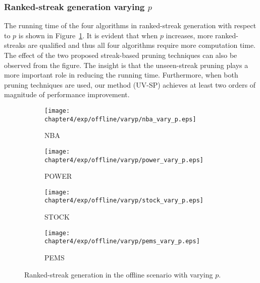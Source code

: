 \subsubsection{Ranked-streak generation varying $p$}
The running time of the four algorithms in ranked-streak generation with respect to $p$ is shown in Figure~\ref{exp:offline_performance_vary_p}. It is evident that when $p$ increases, more ranked-streaks are qualified and thus all four algorithms require more computation time. The effect of the two proposed streak-based pruning techniques can also be observed from the figure. The insight is that the unseen-streak pruning plays a more important role in reducing the running time. Furthermore, when both pruning techniques are used, our method (UV-SP) achieves at least two orders of magnitude of performance improvement.

\begin{figure}[t]
\centering
    \begin{subfigure}[b]{0.45\textwidth}
        \texttt{[image: chapter4/exp/offline/varyp/nba\_vary\_p.eps]}
        \caption{NBA}
    \end{subfigure}
    \begin{subfigure}[b]{0.45\textwidth}
        \texttt{[image: chapter4/exp/offline/varyp/power\_vary\_p.eps]}
        \caption{POWER}
    \end{subfigure}
    \begin{subfigure}[b]{0.45\textwidth}
        \texttt{[image: chapter4/exp/offline/varyp/stock\_vary\_p.eps]}
        \caption{STOCK}
    \end{subfigure}
    \begin{subfigure}[b]{0.45\textwidth}
        \texttt{[image: chapter4/exp/offline/varyp/pems\_vary\_p.eps]}
        \caption{PEMS}
    \end{subfigure}
\caption{Ranked-streak generation in the offline scenario with varying $p$.}
\label{exp:offline_performance_vary_p}
\end{figure}

